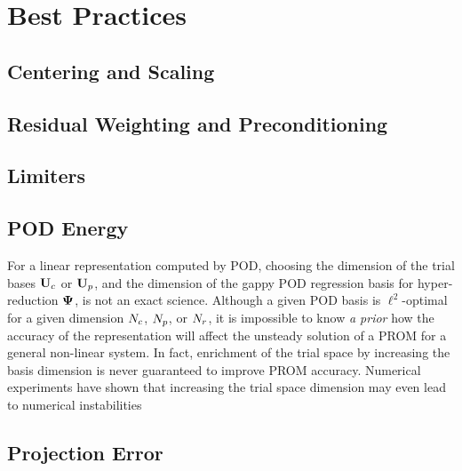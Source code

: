 \section{Best Practices}

\subsection{Centering and Scaling}\label{subsec:centerScale}

\subsection{Residual Weighting and Preconditioning}\label{subsec:resWeight}

\subsection{Limiters}

\subsection{POD Energy}

For a linear representation computed by POD, choosing the dimension of the trial bases $\consTrial$ or $\primTrial$, and the dimension of the gappy POD regression basis for hyper-reduction $\deimBasis$, is not an exact science. Although a given POD basis is $\ell^2$-optimal for a given dimension $N_c$, $N_p$, or $N_r$, it is impossible to know \textit{a prior} how the accuracy of the representation will affect the unsteady solution of a PROM for a general non-linear system. In fact, enrichment of the trial space by increasing the basis dimension is never guaranteed to improve PROM accuracy. Numerical experiments have shown that increasing the trial space dimension may even lead to numerical instabilities~\cite{Huang2022}

\subsection{Projection Error}\label{subsec:projError}

